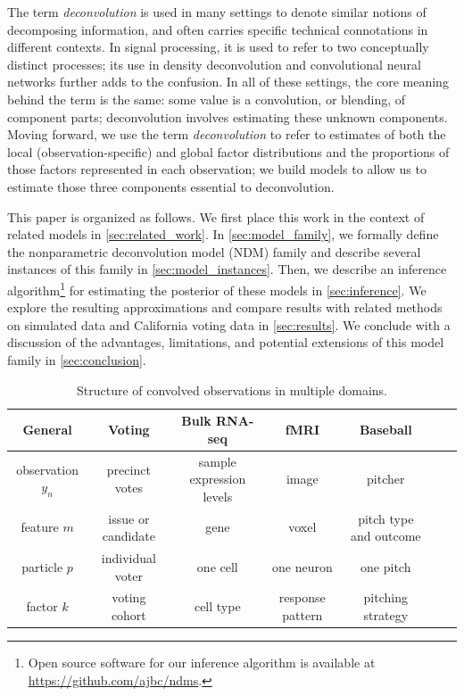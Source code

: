 \documentclass[twoside,11pt]{article}
\begin{document}
The term \emph{deconvolution} is used in many settings to denote similar notions of decomposing information, and often carries specific technical connotations in different contexts.  In signal processing, it is used to refer to two conceptually distinct processes; its use in density deconvolution and convolutional neural networks further adds to the confusion.  In all of these settings, the core meaning behind the term is the same: some value is a convolution, or blending, of component parts; deconvolution involves estimating these unknown components.  
Moving forward, we use the term \emph{deconvolution} to refer to estimates of both the local (observation-specific) and global factor distributions and the proportions of those factors represented in each observation; we build models to allow us to estimate those three components essential to deconvolution.

This paper is organized as follows. We first place this work in the context of related models in \cref{sec:related_work}.
In \cref{sec:model_family}, we formally define the nonparametric deconvolution model (NDM) family and describe several instances of this family in \cref{sec:model_instances}.
Then, we describe an inference algorithm\footnote{Open source software for our inference algorithm is available at \url{https://github.com/ajbc/ndms}.} for estimating the posterior of these models in \cref{sec:inference}. We explore the resulting approximations and compare results with related methods on simulated data and California voting data in \cref{sec:results}.  We conclude with a discussion of the advantages, limitations, and potential extensions of this model family in \cref{sec:conclusion}.


\begin{table}[!ht]
\small
\centering
\begin{tabular}{ccccccc}
\toprule
\textbf{General} & \textbf{Voting} & \textbf{Bulk RNA-seq} & \textbf{fMRI} & \textbf{Baseball} \\
\midrule
observation $y_n$ & precinct votes & sample expression levels & image & pitcher \\
feature $m$ & issue or candidate & gene & voxel & pitch type and outcome \\
particle $p$ & individual voter & one cell & one neuron & one pitch \\
factor $k$ & voting cohort & cell type & response pattern & pitching strategy \\
\bottomrule
\end{tabular}
\caption{Structure of convolved observations in multiple domains.}
\label{tab:nomenclature}
\end{table}
\end{document}
